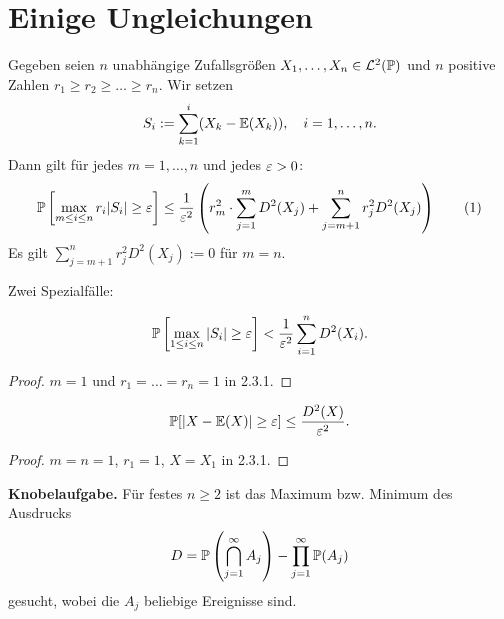 \section{Einige Ungleichungen}
\begin{thm}
  Gegeben seien $n$ unabhängige Zufallsgrößen $X_1, \ldots, X_n \in
  \mathcal{L}^2(\mathbb{P})$ und $n$ positive Zahlen $r_1 \ge r_2  \ge \ldots \ge r_n$. Wir
  setzen
  \[ S_i := \sum_{k=1}^i (X_k - \mathbb{E}(X_k)), \quad i = 1, \ldots, n. \]
  Dann gilt für jedes $m = 1, \ldots, n$ und jedes $\varepsilon > 0$:
  \[ \mathbb{P} \left[ \max_{m \le i \le n} r_i | S_i | \ge \varepsilon \right] \le
    \frac{1}{\varepsilon^2} \left( r_m^2 \cdot \sum_{j=1}^m D^2(X_j) + \sum_{j=m+1}^n r_j^2
      D^2( X_j) \right) \tag{1} \]
  Es gilt $\sum_{j=m+1}^n r_j^2 D^2( X_j) := 0$  für $m=n$.
\end{thm}

Zwei Spezialfälle:

\begin{folg}
  \[ \mathbb{P} \left[  \max_{1 \le i \le n} |S_i| \ge \varepsilon \right] <
    \frac{1}{\varepsilon^2} \sum_{i=1}^n D^2(X_i).  \]
\end{folg}

\begin{proof}
  $m=1$ und $r_1 = \ldots = r_n = 1$ in 2.3.1.
\end{proof}

\begin{folg}
  \[ \mathbb{P} [ | X - \mathbb{E}(X) | \ge \varepsilon ] \le \frac{D^2(X)}{\varepsilon^2}.  \]
\end{folg}

\begin{proof}
  $m = n = 1$, $r_1 = 1$, $X = X_1$ in 2.3.1.
\end{proof}

\textbf{Knobelaufgabe.} Für festes $n \ge 2$ ist das Maximum bzw. Minimum des
Ausdrucks
\[ D = \mathbb{P} \left( \bigcap_{j=1}^\infty A_j \right)
  - \prod_{j=1}^\infty \mathbb{P}( A_j )\]
gesucht, wobei die $A_j$ beliebige Ereignisse sind.

